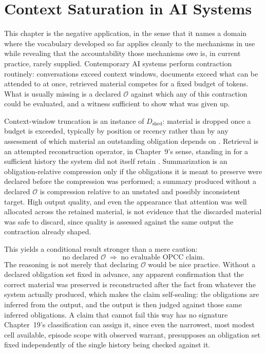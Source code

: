 \documentclass[11pt]{report}
\begin{document}
\chapter{Context Saturation in AI Systems}

This chapter is the negative application, in the sense that it names a domain where the vocabulary developed so far applies cleanly to the mechanisms in use while revealing that the accountability those mechanisms owe is, in current practice, rarely supplied. Contemporary AI systems perform contraction routinely: conversations exceed context windows, documents exceed what can be attended to at once, retrieved material competes for a fixed budget of tokens. What is usually missing is a declared $\mathcal O$ against which any of this contraction could be evaluated, and a witness sufficient to show what was given up.

Context-window truncation is an instance of $D_{\mathrm{shed}}$: material is dropped once a budget is exceeded, typically by position or recency rather than by any assessment of which material an outstanding obligation depends on \cite{liu2024lost,bai2024}. Retrieval is an attempted reconstruction operator, in Chapter~9's sense, standing in for a sufficient history the system did not itself retain \cite{lewis2020}. Summarization is an obligation-relative compression only if the obligations it is meant to preserve were declared before the compression was performed; a summary produced without a declared $\mathcal O$ is compression relative to an unstated and possibly inconsistent target. High output quality, and even the appearance that attention was well allocated across the retained material, is not evidence that the discarded material was safe to discard, since quality is assessed against the same output the contraction already shaped.

This yields a conditional result stronger than a mere caution:
\[
\text{no declared } \mathcal O \;\Longrightarrow\; \text{no evaluable OPCC claim}.
\]
The reasoning is not merely that declaring $\mathcal O$ would be nice practice. Without a declared obligation set fixed in advance, any apparent confirmation that the correct material was preserved is reconstructed after the fact from whatever the system actually produced, which makes the claim self-sealing: the obligations are inferred from the output, and the output is then judged against those same inferred obligations. A claim that cannot fail this way has no signature Chapter~19's classification can assign it, since even the narrowest, most modest cell available, episode scope with observed warrant, presupposes an obligation set fixed independently of the single history being checked against it.
\end{document}
